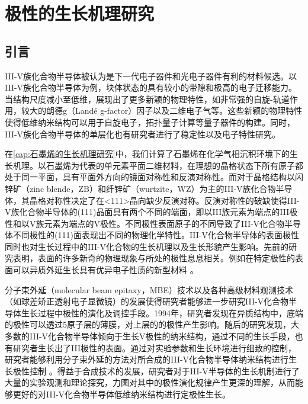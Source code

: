 \chapter{极性的生长机理研究}
\section{引言}
III-V族化合物半导体被认为是下一代电子器件和光电子器件有利的材料候选。以III-V族化合物半导体为例，块体状态的具有较小的带隙和极高的电子迁移能力。当结构尺度减小至低维，展现出了更多新颖的物理特性，如非常强的自旋-轨道作用，较大的朗德g（Landé g-factor）因子以及二维电子气等。这些新颖的物理特性使得低维纳米结构可以用于自旋电子，拓扑量子计算等量子器件的构建。同时，III-V族化合物半导体的单层化也有研究者进行了稳定性以及电子特性研究。

在\ref{cap:石墨烯的生长机理研究}中，我们计算了石墨烯在化学气相沉积环境下的生长机理。以石墨烯为代表的单元素平面二维材料，在理想的晶格状态下所有原子都处于同一平面，具有平面外方向的镜面对称性和反演对称性。而对于晶格结构以闪锌矿（zinc blende，ZB）和纤锌矿（wurtzite，WZ）为主的III-V族化合物半导体，其晶格对称性决定了在<111>晶向缺少反演对称。反演对称性的破缺使得III-V族化合物半导体的(111)晶面具有两个不同的端面，即以III族元素为端点的III极性和以V族元素为端点的V极性。不同极性表面原子的不同导致了III-V化合物半导体不同极性的(111)面表现出不同的物理化学特性。III-V化合物半导体的表面极性同时也对生长过程中的III-V化合物的生长机理以及生长形貌产生影响。先前的研究表明，表面的许多新奇的物理现象与所处的极性息息相关。例如在特定极性的表面可以异质外延生长具有优异电子性质的新型材料 。

分子束外延（molecular beam epitaxy，MBE）技术以及各种高级材料观测技术（如球差矫正透射电子显微镜）的发展使得研究者能够进一步研究III-V化合物半导体生长过程中极性的演化及调控手段。1994年，研究者发现在异质结构中，底端的极性可以透过5原子层的薄膜，对上层的的极性产生影响。随后的研究发现，大多数的III-V化合物半导体倾向于生长V极性的纳米结构，通过不同的生长手段，也有研究者生长出了III极性的表面。通过对实验参数和生长环境进行细致的控制，研究者能够利用分子束外延的方法对所合成的III-V化合物半导体纳米结构进行生长极性控制 。得益于合成技术的发展，研究者对于III-V半导体的生长机制进行了大量的实验观测和理论探究，力图对其中的极性演化规律产生更深的理解，从而能够更好的对III-V化合物半导体低维纳米结构进行定极性生长。

